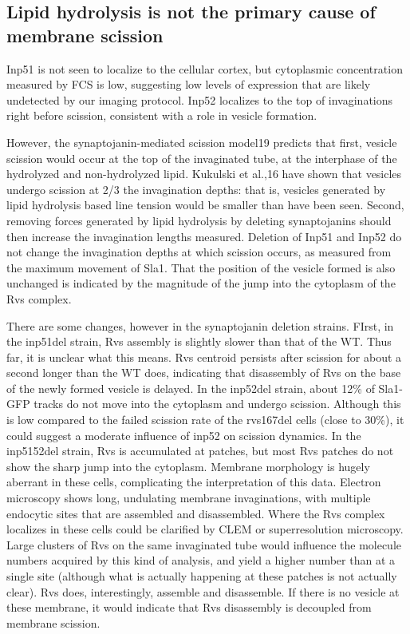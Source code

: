 \subsection{Lipid hydrolysis is not the primary cause of membrane scission}
Inp51 is not seen to localize to the cellular cortex, but cytoplasmic concentration measured by FCS is low, suggesting low levels of expression that are likely undetected by our imaging protocol. Inp52 localizes to the top of invaginations right before scission, consistent with a role in vesicle formation. 

However, the synaptojanin-mediated scission model19 predicts that first, vesicle scission would occur at the top of the invaginated tube, at the interphase of the hydrolyzed and non-hydrolyzed lipid. Kukulski et al.,16 have shown that vesicles undergo scission at 2/3 the invagination depths: that is, vesicles generated by lipid hydrolysis based line tension would be smaller than have been seen. Second, removing forces generated by lipid hydrolysis by deleting synaptojanins should then increase the invagination lengths measured. Deletion of Inp51 and Inp52 do not change the invagination depths at which scission occurs, as measured from the maximum movement of Sla1. That the position of the vesicle formed is also unchanged is indicated by the magnitude of the jump into the cytoplasm of the Rvs complex. 

There are some changes, however in the synaptojanin deletion strains. FIrst, in the inp51del strain, Rvs assembly is slightly slower than that of the WT. Thus far, it is unclear what this means. Rvs centroid persists after scission for about a second longer than the WT does, indicating that disassembly of Rvs on the base of the newly formed vesicle is delayed. In the inp52del strain, about 12\% of Sla1-GFP tracks do not move into the cytoplasm and undergo scission. Although this is low compared to the failed scission rate of the rvs167del cells (close to 30\%), it could suggest a moderate influence of inp52 on scission dynamics. In the inp5152del strain, Rvs is accumulated at patches, but most Rvs patches do not show the sharp jump into the cytoplasm. Membrane morphology is hugely aberrant in these cells, complicating the interpretation of this data. 
Electron microscopy shows long, undulating membrane invaginations, with multiple endocytic sites that are assembled and disassembled. Where the Rvs complex localizes in these cells could be clarified by CLEM or superresolution microscopy. Large clusters of Rvs on the same invaginated tube would influence the molecule numbers acquired by this kind of analysis, and yield a higher number than at a single site (although what is actually happening at these patches is not actually clear). Rvs does, interestingly, assemble and disassemble. If there is no vesicle at these membrane, it would indicate that Rvs disassembly is decoupled from membrane scission.


